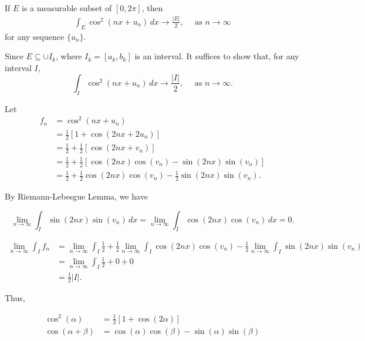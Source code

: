 \documentclass[UTF8,a4paper,10pt]{article}
\begin{document}
\begin{Problem}[]{}
  If \(E\) is a measurable subset of \([0,2\pi]\), then
  \begin{align*}
    \int_{E} \cos^2(nx + u_{n}) \,dx\to\frac{|E|}{2},\quad \text{ as }n\to \infty
  \end{align*}
  for any sequence \(\{u_n\}\).
\end{Problem}

Since \(E\subseteq\cup I_k\), where \(I_k = [a_k, b_k]\) is an interval. It suffices to show that, for any interval \(I\), \[\int_{I} \cos^2(nx + u_{n}) \,dx\to\frac{|I|}{2},\quad \text{ as }n\to \infty.\]
  
Let 
\begin{align*}
  f_n &= \cos^2 (nx + u_{n})\\
  &=\frac{1}{2}\left[1 + \cos(2nx + 2u_{n})\right]\\
  &=\frac{1}{2} + \frac{1}{2}\left[\cos(2nx + v_{n})\right]\\
  &=\frac{1}{2} + \frac{1}{2}\left[\cos(2nx)\cos(v_{n})-\sin(2nx)\sin(v_{n})\right]\\
  &=\frac{1}{2} + \frac{1}{2}\cos(2nx)\cos(v_{n})-\frac{1}{2}\sin(2nx)\sin(v_{n}).
\end{align*}

By Riemann-Lebesgue Lemma, we have

\[\lim_{n\to\infty}\int_{I}\sin(2nx)\sin(v_{n}) \, dx = \lim_{n\to\infty}\int_{I}\cos(2nx)\cos(v_{n}) \, dx = 0.\]


\begin{align*}
  \lim_{n\to \infty}\int_{I} f_n &=  \lim_{n\to \infty}\int_{I}\frac{1}{2} + \frac{1}{2} \lim_{n\to \infty}\int_{I}\cos(2nx)\cos(v_{n})-\frac{1}{2} \lim_{n\to \infty}\int_{I}\sin(2nx)\sin(v_{n})\\
  & = \lim_{n\to \infty}\int_{I}\frac{1}{2} + 0 + 0\\
  & = \frac{1}{2}|I|.
\end{align*}

Thus,

\begin{mybox}{}
  \begin{align*}
    \cos^2(\alpha) &= \frac{1}{2}[1+\cos(2\alpha)]\\
    \cos(\alpha+\beta) &= \cos(\alpha)\cos(\beta)-\sin(\alpha)\sin(\beta)
  \end{align*}

\end{mybox}
\end{document}
